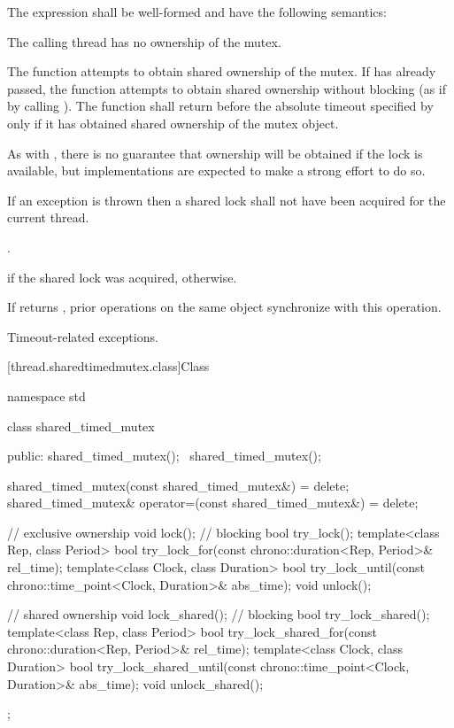 \pnum
The expression  shall be well-formed
and have the following semantics:

\begin{itemdescr}
\pnum
\requires The calling thread has no ownership of the mutex.

\pnum
\effects
The function attempts to obtain shared ownership of the mutex. If
 has already passed, the function attempts to obtain shared
ownership without blocking (as if by calling ). The
function shall return before the absolute timeout
specified by  only if it has obtained shared ownership of the
mutex object.
\begin{note}
As with , there is no guarantee that
ownership will be obtained if the lock is available, but implementations are
expected to make a strong effort to do so.
\end{note}
If an exception is thrown then a shared lock shall not have been acquired for
the current thread.

\pnum
\returntype {}.

\pnum
\returns
{} if the shared lock was acquired,  otherwise.

\pnum
\sync
If  returns , prior
 operations on the same object synchronize
with this operation.

\pnum
\throws
Timeout-related exceptions.
\end{itemdescr}

[thread.sharedtimedmutex.class]{Class }

%
\begin{codeblock}
namespace std {
  class shared_timed_mutex {
  public:
    shared_timed_mutex();
    ~shared_timed_mutex();

    shared_timed_mutex(const shared_timed_mutex&) = delete;
    shared_timed_mutex& operator=(const shared_timed_mutex&) = delete;

    // exclusive ownership
    void lock();                // blocking
    bool try_lock();
    template<class Rep, class Period>
      bool try_lock_for(const chrono::duration<Rep, Period>& rel_time);
    template<class Clock, class Duration>
      bool try_lock_until(const chrono::time_point<Clock, Duration>& abs_time);
    void unlock();

    // shared ownership
    void lock_shared();         // blocking
    bool try_lock_shared();
    template<class Rep, class Period>
      bool try_lock_shared_for(const chrono::duration<Rep, Period>& rel_time);
    template<class Clock, class Duration>
      bool try_lock_shared_until(const chrono::time_point<Clock, Duration>& abs_time);
    void unlock_shared();
  };
}
\end{codeblock}

